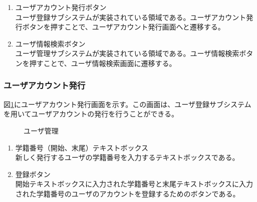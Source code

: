 \documentclass[a4j]{jarticle}
\begin{document}
\begin{enumerate}
  \renewcommand{\labelenumi}{\textcircled{\scriptsize \theenumi}}

\item ユーザアカウント発行ボタン\\
ユーザ登録サブシステムが実装されている領域である。ユーザアカウント発行ボタンを押すことで、ユーザアカウント発行画面へと遷移する。

\item ユーザ情報検索ボタン\\
ユーザ管理サブシステムが実装されている領域である。ユーザ情報検索ボタンを押すことで、ユーザ情報検索画面に遷移する。

\end{enumerate}

\subsubsection{ユーザアカウント発行}
図\ref{fig:create_user}にユーザアカウント発行画面を示す。この画面は、ユーザ登録サブシステムを用いてユーザアカウントの発行を行うことができる。
\begin{figure}[H]
\centering
{}
\caption{ユーザ管理}
\label{fig:create_user}
\end{figure}

\begin{enumerate}
  \renewcommand{\labelenumi}{\textcircled{\scriptsize \theenumi}}

\item 学籍番号（開始、末尾）テキストボックス\\
  新しく発行するユーザの学籍番号を入力するテキストボックスである。
\item 登録ボタン\\
  開始テキストボックスに入力された学籍番号と末尾テキストボックスに入力された学籍番号のユーザのアカウントを登録するためのボタンである。
\end{enumerate}
\end{document}
